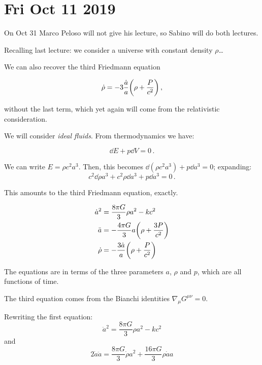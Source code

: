\documentclass[main.tex]{subfiles}
\begin{document}
\section*{Fri Oct 11 2019}

On Oct 31 Marco Peloso will not give his lecture, so Sabino will do both lectures.

Recalling last lecture: 
we consider a universe with constant density \(\rho\)\dots

We can also recover the third Friedmann equation 

\begin{equation}
  \dot{\rho} = -3 \frac{\dot{a}}{a} \qty(\rho + \frac{P}{c^2})\,,
\end{equation}

without the last term, which yet again will come from the relativistic consideration.

We will consider \emph{ideal fluids}. From thermodynamics we have:

\begin{equation}
  \dd{E} + p\dd{V} = 0\,.
\end{equation}

We can write \(E = \rho c^2 a^{3}\). Then, this becomes \(\dd{(\rho c^2 a^3)} + p \dd{a^3} = 0\); expanding:
\begin{equation}
  c^2 \dd \rho a^3 + c^2 \rho \dd{a^3} + p \dd{a^3} = 0\,.
\end{equation}

This amounts to the third Friedmann equation, exactly.

\begin{subequations}
    \begin{align}
        \dot{a}^2 &= \frac{8 \pi G }{3} \rho a^2 - kc^2  \\
        \ddot{a} &= - \frac{4 \pi G }{3} a  \qty(\rho  + \frac{3P}{c^2} )  \\
        \dot{\rho} &= -\frac{3\dot{a} }{a} \qty(\rho + \frac{P}{c^2} )
    \end{align}
\end{subequations}    

The equations are in terms of the three parameters \(a\), \(\rho\) and \(p\), which are all functions of time.

The third equation comes from the Bianchi identities \(\nabla_{\mu} G^{\mu \nu}=0\).

Rewriting the first equation:
\begin{equation}
  \ddot{a}^2 = \frac{8 \pi G}{3} \rho a^2 - k c^2
\end{equation}
and
\begin{equation}
  2 \dot{a} \ddot{a} = 
  \frac{8 \pi G}{3} \dot{\rho} a^2 + \frac{16 \pi G}{3} \rho \dot{a} a 
\end{equation}
\end{document}
